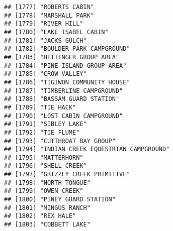 \documentclass[
]{article}
\begin{document}
\begin{verbatim}
## [1777] "ROBERTS CABIN"                                                                       
## [1778] "MARSHALL PARK"                                                                       
## [1779] "RIVER HILL"                                                                          
## [1780] "LAKE ISABEL CABIN"                                                                   
## [1781] "JACKS GULCH"                                                                         
## [1782] "BOULDER PARK CAMPGROUND"                                                             
## [1783] "HETTINGER GROUP AREA"                                                                
## [1784] "PINE ISLAND GROUP AREA"                                                              
## [1785] "CROW VALLEY"                                                                         
## [1786] "TIGIWON COMMUNITY HOUSE"                                                             
## [1787] "TIMBERLINE CAMPGROUND"                                                               
## [1788] "BASSAM GUARD STATION"                                                                
## [1789] "TIE HACK"                                                                            
## [1790] "LOST CABIN CAMPGROUND"                                                               
## [1791] "SIBLEY LAKE"                                                                         
## [1792] "TIE FLUME"                                                                           
## [1793] "CUTTHROAT BAY GROUP"                                                                 
## [1794] "INDIAN CREEK EQUESTRIAN CAMPGROUND"                                                  
## [1795] "MATTERHORN"                                                                          
## [1796] "SHELL CREEK"                                                                         
## [1797] "GRIZZLY CREEK PRIMITIVE"                                                             
## [1798] "NORTH TONGUE"                                                                        
## [1799] "OWEN CREEK"                                                                          
## [1800] "PINEY GUARD STATION"                                                                 
## [1801] "MINGUS RANCH"                                                                        
## [1802] "REX HALE"                                                                            
## [1803] "COBBETT LAKE"                                                                        

\end{verbatim}
\end{document}
